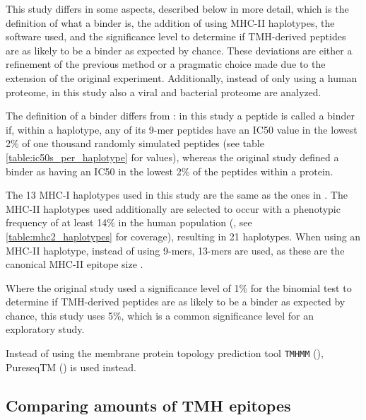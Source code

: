 This study differs in some aspects, described below in more detail,
which is the definition of what a binder is,
the addition of using MHC-II haplotypes, the software used,
and the significance level to determine if TMH-derived peptides are as 
likely to be a binder as expected by chance.
These deviations are either a refinement of the previous method or
a pragmatic choice made due to the extension of the original experiment.
Additionally, instead of only using a human proteome, in this study
also a viral and bacterial proteome are analyzed.

The definition of a binder differs from \cite{bianchi2017}:
in this study a peptide is called a binder if, within a haplotype, 
any of its 9-mer peptides have an IC50 value in the lowest 2\% of 
one thousand randomly simulated 
peptides (see table \ref{table:ic50s_per_haplotype} for values), 
whereas the original study defined
a binder as having an IC50 in the lowest 2\% of the peptides within a protein.

The 13 MHC-I haplotypes used in this study are the same as 
the ones in \cite{bianchi2017}.
The MHC-II haplotypes used additionally are selected 
to occur with a phenotypic frequency of at least 
14\% in
the human population (\cite{greenbaum2011functional},
see \ref{table:mhc2_haplotypes} for coverage),
resulting in 21 haplotypes.
When using an MHC-II haplotype, instead of using 9-mers, 13-mers are
used, as these are the canonical MHC-II epitope size .

Where the original study used a significance level of 1\% 
for the binomial test to determine if TMH-derived peptides 
are as likely to be a binder as expected by chance, this study
uses 5\%, which is a common significance level for an exploratory study.

Instead of using the membrane protein topology prediction
tool \verb;TMHMM; (\cite{krogh2001predicting}), PureseqTM (\cite{wang2019efficient})
is used instead.

\subsection{Comparing amounts of TMH epitopes}


